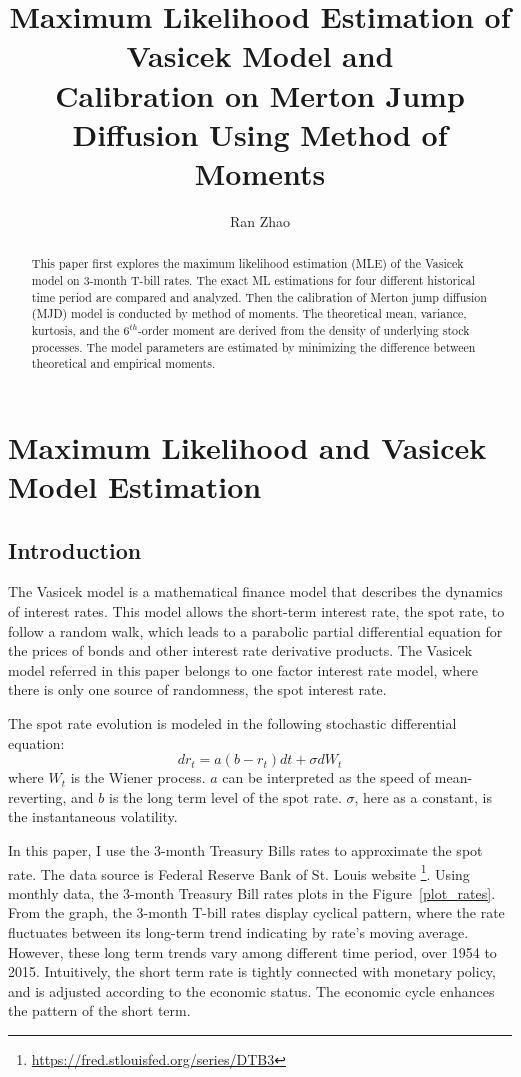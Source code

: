 \documentclass[11pt,reqno,final]{amsart}
\title{Maximum Likelihood Estimation of Vasicek Model and \\ Calibration on Merton Jump Diffusion Using Method of Moments}
\author{Ran Zhao}
\begin{document}
\begin{abstract}
This paper first explores the maximum likelihood estimation (MLE) of the Vasicek model on 3-month T-bill rates. The exact ML estimations for four different historical time period are compared and analyzed. Then the calibration of Merton jump diffusion (MJD) model is conducted by method of moments. The theoretical mean, variance, kurtosis, and the $6^{th}$-order moment are derived from the density of underlying stock processes. The model parameters are estimated by minimizing the difference between theoretical and empirical moments. 
\end{abstract}

\maketitle
%
%
%
\section{Maximum Likelihood and Vasicek Model Estimation}
\subsection{Introduction}
The Vasicek model \cite{V77} is a mathematical finance model that
describes the dynamics of interest rates. This model allows the short-term
interest rate, the spot rate, to follow a random walk, which leads
to a parabolic partial differential equation for the prices of bonds
and other interest rate derivative products. The Vasicek model referred in this paper
belongs to one factor interest rate model, where there is only one source of
randomness, the spot interest rate.

The spot rate evolution is modeled in the following stochastic differential equation:
\begin{equation} \label{vasicek_equation}
dr_t = a(b-r_t)dt + \sigma dW_t
\end{equation}
where $W_t$ is the Wiener process. $a$ can be interpreted as the speed of mean-reverting, and $b$ is the long term level of the spot rate. $\sigma$, here as
a constant, is the instantaneous volatility.

In this paper, I use the 3-month Treasury Bills rates to approximate the spot rate. The data source is Federal Reserve Bank of St. Louis website \footnote{\url{https://fred.stlouisfed.org/series/DTB3}}. Using monthly data, the 3-month Treasury Bill rates plots in the Figure~\ref{plot_rates}. From the graph, the 3-month T-bill rates display cyclical pattern, where the rate fluctuates between its long-term trend indicating by rate's moving average. However, these long term trends vary among different time period, over 1954 to 2015. Intuitively, the short term rate is tightly connected with monetary policy, and is adjusted according to the economic status. The economic cycle enhances the pattern of the short term.
\end{document}
